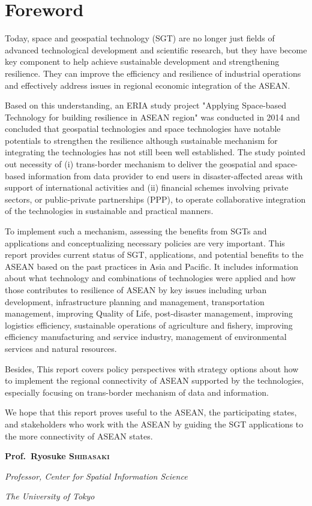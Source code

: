\chapter*{Foreword}

Today, space and geospatial technology (SGT) are no longer just fields of advanced technological development and scientific research, but they have become key component to help achieve sustainable development and strengthening resilience. They can improve the efficiency and resilience of industrial operations and effectively address issues in regional economic integration of  the ASEAN.

Based on this understanding, an ERIA study project "Applying Space-based Technology for building resilience in ASEAN region" was conducted in 2014 and concluded that geospatial technologies and space technologies have notable potentials to strengthen the resilience although sustainable mechanism for integrating the technologies  has not still been well established. The study pointed out necessity of (i) trans-border mechanism to deliver the geospatial and space-based information from data provider to end users in disaster-affected areas with support of international activities and (ii) financial schemes involving private sectors, or public-private partnerships (PPP), to operate collaborative integration of the technologies in sustainable and practical manners.

To implement such a mechanism, assessing the benefits from SGTs and applications and conceptualizing necessary policies are very important.
This report provides current status of SGT, applications, and potential benefits to the ASEAN based on the past practices in Asia and Pacific. It includes information about what technology and combinations of technologies were applied and how those contributes to resilience of ASEAN by key issues including urban development, infrastructure planning and management, transportation management, improving Quality of Life, post-disaster management, improving logistics efficiency, sustainable operations of agriculture and fishery, improving efficiency manufacturing and service industry, management of environmental services and natural resources.

Besides, This report covers policy perspectives with strategy options about how to implement the regional connectivity of ASEAN supported by the technologies, especially focusing on trans-border mechanism of data and information.

We hope that this report proves useful to the ASEAN, the participating states, and stakeholders who work with the ASEAN by guiding the SGT applications to the more connectivity of ASEAN states.

\begin{flushright}
\vspace{1 cm}
{\Large \bfseries Prof.~Ryosuke \textsc{Shibasaki}\par}
\vspace{0.2 cm}
{\itshape Professor, Center for Spatial Information Science\par}
{\itshape The University of Tokyo\par}
\end{flushright}

